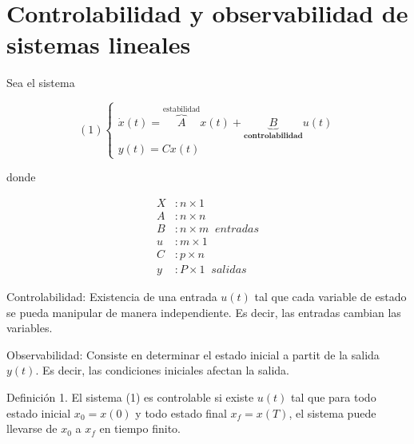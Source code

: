 \section{Controlabilidad y observabilidad de sistemas lineales}

Sea el sistema 

\[
    (1)
    \left\{
        \begin{array}{lll}
            \dot{x}(t) = \overbrace{A}^{\text{estabilidad}}x(t) + \underbrace{B}_{\textbf{controlabilidad}}u(t)\\
            y(t) = Cx(t)
        \end{array}
    \right.
\]

donde 

\[
    \begin{split}
        X & : n\times 1\\
        A & : n\times n\\
        B & : n\times m \;\; entradas\\
        u & : m\times 1\\
        C & : p\times n\\
        y & : P\times 1 \;\;salidas
    \end{split}
\]

Controlabilidad: Existencia de una entrada \(u(t)\) tal que cada variable de estado se pueda manipular de manera independiente. Es decir, las entradas cambian las variables.

Observabilidad: Consiste en determinar el estado inicial a partit de la salida \(y(t)\). Es decir, las condiciones iniciales afectan la salida.

Definición 1. El sistema (1) es controlable si existe \(u(t)\) tal que para todo estado inicial \(x_{0}=x(0)\) y todo estado final \(x_{f}=x(T)\), el sistema puede llevarse de \(x_{0}\) a \(x_{f}\) en tiempo finito.